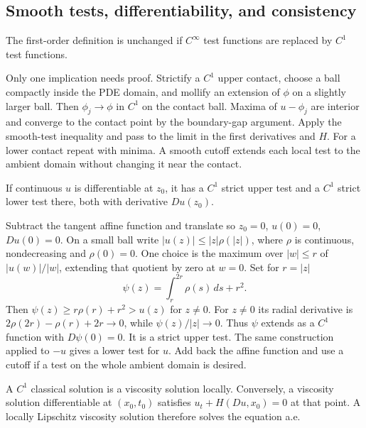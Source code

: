 \subsection{Smooth tests, differentiability, and consistency}
\Needspace{50mm}
\begin{lemma}
The first-order definition is unchanged if $C^\infty$ test functions
are replaced by $C^1$ test functions.
\end{lemma}
\begin{expandedproof}
Only one implication needs proof. Strictify a $C^1$ upper contact,
choose a ball compactly inside the PDE domain, and mollify an extension
of $\phi$ on a slightly larger ball. Then $\phi_j\to\phi$ in $C^1$
on the contact ball. Maxima of $u-\phi_j$ are interior and converge
to the contact point by the boundary-gap argument. Apply the smooth-test
inequality and pass to the limit in the first derivatives and $H$.
For a lower contact repeat with minima. A smooth cutoff extends each
local test to the ambient domain without changing it near the contact.
\end{expandedproof}
\Needspace{50mm}
\begin{lemma}
If continuous $u$ is differentiable at $z_0$, it has a $C^1$ strict
upper test and a $C^1$ strict lower test there, both with derivative $Du(z_0)$.
\end{lemma}
\begin{expandedproof}
Subtract the tangent affine function and translate so $z_0=0$,
$u(0)=0$, $Du(0)=0$. On a small ball write
$|u(z)|\leq |z|\rho(|z|)$, where $\rho$ is continuous,
nondecreasing and $\rho(0)=0$. One choice is the maximum over $|w|\leq r$
of $|u(w)|/|w|$, extending that quotient by zero at $w=0$.
Set for $r=|z|$
\[
 \psi(z)=\int_r^{2r}\rho(s)\,ds+r^2.
\]
Then $\psi(z)\geq r\rho(r)+r^2>u(z)$ for $z\ne0$.
For $z\ne0$ its radial derivative is
$2\rho(2r)-\rho(r)+2r\to0$, while $\psi(z)/|z|\to0$.
Thus $\psi$ extends as a $C^1$ function with $D\psi(0)=0$.
It is a strict upper test. The same construction applied to $-u$
gives a lower test for $u$. Add back the affine function and use a cutoff
if a test on the whole ambient domain is desired.
\end{expandedproof}
\Needspace{55mm}
\begin{theorem}
A $C^1$ classical solution is a viscosity solution locally. Conversely,
a viscosity solution differentiable at $(x_0,t_0)$ satisfies
$u_t+H(Du,x_0)=0$ at that point. A locally Lipschitz viscosity solution
therefore solves the equation a.e.
\end{theorem}
